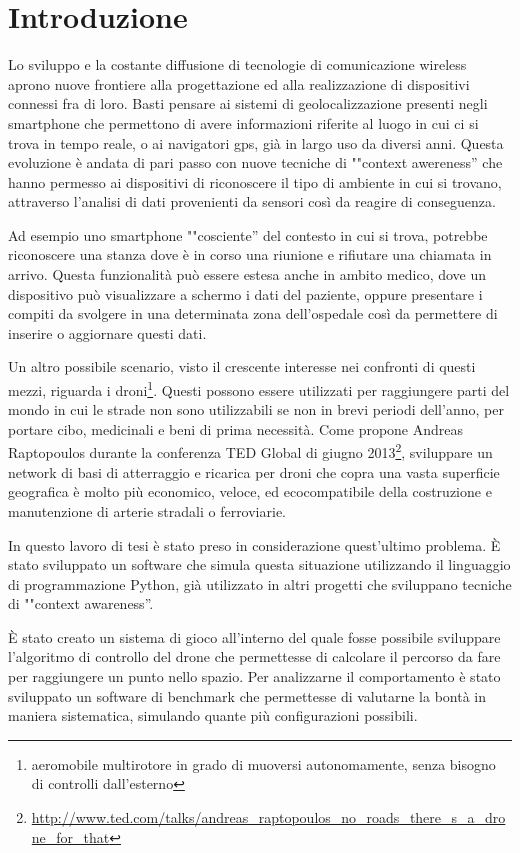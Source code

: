 \chapter*{Introduzione}
Lo sviluppo e la costante diffusione di tecnologie di comunicazione wireless aprono nuove frontiere alla progettazione ed alla realizzazione di dispositivi connessi fra di loro. Basti pensare ai sistemi di geolocalizzazione presenti negli smartphone che permettono di avere informazioni riferite al luogo in cui ci si trova in tempo reale, o ai navigatori gps, già in largo uso da diversi anni. Questa evoluzione è andata di pari passo con nuove tecniche di ""context awereness'' che hanno permesso ai dispositivi di riconoscere il tipo di ambiente in cui si trovano, attraverso l'analisi di dati provenienti da sensori così da reagire di conseguenza. 

Ad esempio uno smartphone ""cosciente'' del contesto in cui si trova, potrebbe riconoscere una stanza dove è in corso una riunione e rifiutare una chiamata in arrivo. Questa funzionalità può essere estesa anche in ambito medico, dove un dispositivo può visualizzare a schermo i dati del paziente, oppure presentare i compiti da svolgere in una determinata zona dell'ospedale così da permettere di inserire o aggiornare questi dati. 

Un altro possibile scenario, visto il crescente interesse nei confronti di questi mezzi, riguarda i droni\footnote{aeromobile multirotore in grado di muoversi autonomamente, senza bisogno di controlli dall'esterno}. Questi possono essere utilizzati per raggiungere parti del mondo in cui le strade non sono utilizzabili se non in brevi periodi dell'anno, per portare cibo, medicinali e beni di prima necessità. Come propone Andreas Raptopoulos durante la conferenza TED Global di giugno 2013\footnote{ \url{http://www.ted.com/talks/andreas_raptopoulos_no_roads_there_s_a_drone_for_that} }, sviluppare un network di basi di atterraggio e ricarica per droni che copra una vasta superficie geografica è molto più economico, veloce, ed ecocompatibile della costruzione e manutenzione di arterie stradali o ferroviarie.

In questo lavoro di tesi è stato preso in considerazione quest'ultimo problema. È stato sviluppato un software che simula questa situazione utilizzando il linguaggio di programmazione Python, già utilizzato in altri progetti che sviluppano tecniche di ""context awareness''.

È stato creato un sistema di gioco all'interno del quale fosse possibile sviluppare l'algoritmo di controllo del drone che permettesse di calcolare il percorso da fare per raggiungere un punto nello spazio. Per analizzarne il comportamento è stato sviluppato un software di benchmark che permettesse di valutarne la bontà in maniera sistematica, simulando quante più configurazioni possibili.

